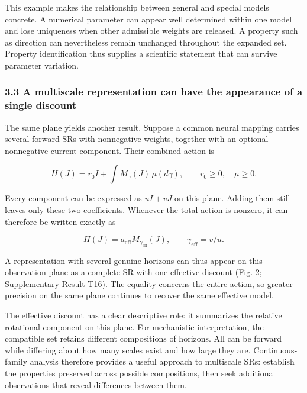\documentclass[11pt,a4paper]{article}
\begin{document}
This example makes the relationship between general and special models
concrete. A numerical parameter can appear well determined within one
model and lose uniqueness when other admissible weights are released. A
property such as direction can nevertheless remain unchanged throughout
the expanded set. Property identification thus supplies a scientific
statement that can survive parameter variation.

\subsubsection{3.3 A multiscale representation can have the appearance
of a single
discount}\label{a-multiscale-representation-can-have-the-appearance-of-a-single-discount}

\par
\noindent\begin{minipage}{\linewidth}

The same plane yields another result. Suppose a common neural mapping
carries several forward SRs with nonnegative weights, together with an
optional nonnegative current component. Their combined action is

\[
H(J)=r_0I+\int M_\gamma(J)\,\mu(d\gamma),
\qquad r_0\geq0,\quad\mu\geq0.
\]

\end{minipage}\par

\par
\noindent\begin{minipage}{\linewidth}

Every component can be expressed as \(uI+vJ\) on this plane. Adding them
still leaves only these two coefficients. Whenever the total action is
nonzero, it can therefore be written exactly as

\[
H(J)=a_{\mathrm{eff}}M_{\gamma_{\mathrm{eff}}}(J),
\qquad \gamma_{\mathrm{eff}}=v/u.
\]

\end{minipage}\par

A representation with several genuine horizons can thus appear on this
observation plane as a complete SR with one effective discount (Fig. 2;
Supplementary Result T16). The equality concerns the entire action, so
greater precision on the same plane continues to recover the same
effective model.

The effective discount has a clear descriptive role: it summarizes the
relative rotational component on this plane. For mechanistic
interpretation, the compatible set retains different compositions of
horizons. All can be forward while differing about how many scales exist
and how large they are. Continuous-family analysis therefore provides a
useful approach to multiscale SRs: establish the properties preserved
across possible compositions, then seek additional observations that
reveal differences between them.
\end{document}
